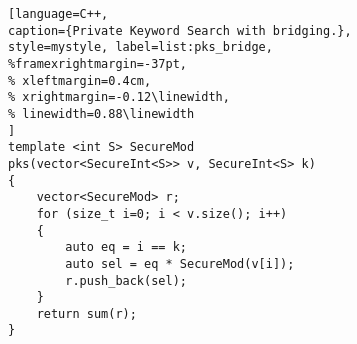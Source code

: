 \begin{figure}[h]
\noindent\begin{minipage}{.50\textwidth}
\begin{lstlisting}[language=C++,
caption={Private Keyword Search with bridging.},
style=mystyle, label=list:pks_bridge,
%framexrightmargin=-37pt,
% xleftmargin=0.4cm,
% xrightmargin=-0.12\linewidth,
% linewidth=0.88\linewidth
]
template <int S> SecureMod
pks(vector<SecureInt<S>> v, SecureInt<S> k)
{
    vector<SecureMod> r;
    for (size_t i=0; i < v.size(); i++)
    {
        auto eq = i == k;
        auto sel = eq * SecureMod(v[i]);
        r.push_back(sel);
    }
    return sum(r);
}
\end{lstlisting}
\end{minipage}
\end{figure}


